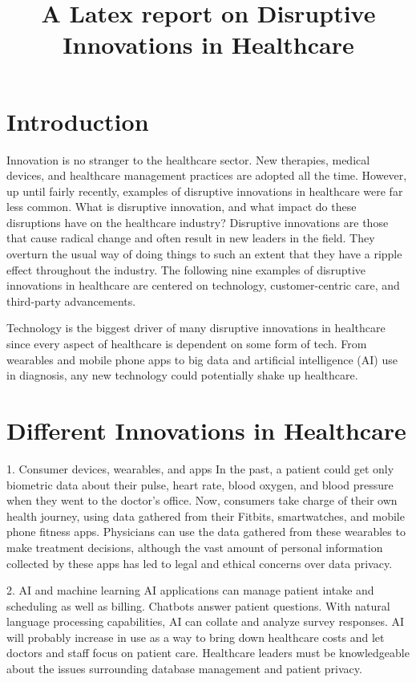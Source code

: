 \documentclass[12pt]{article}
\begin{document}
\title{A Latex report on Disruptive Innovations in Healthcare}
\maketitle{}

\section{Introduction}
Innovation is no stranger to the healthcare sector. New therapies, medical devices, and healthcare management practices are adopted all the time. However, up until fairly recently, examples of disruptive innovations in healthcare were far less common. What is disruptive innovation, and what impact do these disruptions have on the healthcare industry? Disruptive innovations are those that cause radical change and often result in new leaders in the field. They overturn the usual way of doing things to such an extent that they have a ripple effect throughout the industry. The following nine examples of disruptive innovations in healthcare are centered on technology, customer-centric care, and third-party advancements.

Technology is the biggest driver of many disruptive innovations in healthcare since every aspect of healthcare is dependent on some form of tech. From wearables and mobile phone apps to big data and artificial intelligence (AI) use in diagnosis, any new technology could potentially shake up healthcare.

\section{Different Innovations in Healthcare}
1. Consumer devices, wearables, and apps        
In the past, a patient could get only biometric data about their pulse, heart rate, blood oxygen, and blood pressure when they went to the doctor’s office. Now, consumers take charge of their own health journey, using data gathered from their Fitbits, smartwatches, and mobile phone fitness apps. Physicians can use the data gathered from these wearables to make treatment decisions, although the vast amount of personal information collected by these apps has led to legal and ethical concerns over data privacy.

2. AI and machine learning            
AI applications can manage patient intake and scheduling as well as billing. Chatbots answer patient questions. With natural language processing capabilities, AI can collate and analyze survey responses. AI will probably increase in use as a way to bring down healthcare costs and let doctors and staff focus on patient care. Healthcare leaders must be knowledgeable about the issues surrounding database management and patient privacy. 
\end{document}
